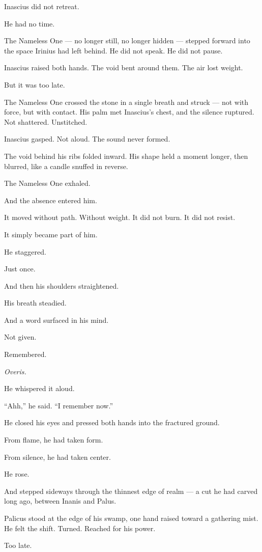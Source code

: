 \documentclass[9pt]{article}
\begin{document}
Inascius did not retreat.

He had no time.

The Nameless One — no longer still, no longer hidden — stepped forward into the space Irinius had left behind. He did not speak. He did not pause.

Inascius raised both hands. The void bent around them. The air lost weight.

But it was too late.

The Nameless One crossed the stone in a single breath and struck — not with force, but with contact. His palm met Inascius’s chest, and the silence ruptured. Not shattered. Unstitched.

Inascius gasped. Not aloud. The sound never formed.

The void behind his ribs folded inward. His shape held a moment longer, then blurred, like a candle snuffed in reverse.

The Nameless One exhaled.

And the absence entered him.

It moved without path. Without weight. It did not burn. It did not resist.

It simply became part of him.

He staggered.

Just once.

And then his shoulders straightened.

His breath steadied.

And a word surfaced in his mind.

Not given.

Remembered.

\emph{Overis.}

He whispered it aloud.

``Ahh,'' he said. ``I remember now.''

He closed his eyes and pressed both hands into the fractured ground.

From flame, he had taken form.

From silence, he had taken center.

He rose.

And stepped sideways through the thinnest edge of realm — a cut he had carved long ago, between Inanis and Palus.

Palicus stood at the edge of his swamp, one hand raised toward a gathering mist. He felt the shift. Turned. Reached for his power.

Too late.
\end{document}
